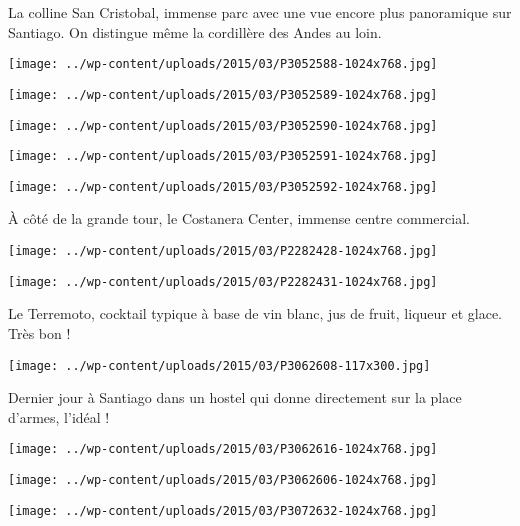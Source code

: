 La colline San Cristobal, immense parc avec une vue encore plus panoramique sur Santiago. On distingue même la cordillère des Andes au loin. 
\begin{center} \texttt{[image: ../wp-content/uploads/2015/03/P3052588-1024x768.jpg]} \end{center}
\begin{center} \texttt{[image: ../wp-content/uploads/2015/03/P3052589-1024x768.jpg]} \end{center}
\begin{center} \texttt{[image: ../wp-content/uploads/2015/03/P3052590-1024x768.jpg]} \end{center}
\begin{center} \texttt{[image: ../wp-content/uploads/2015/03/P3052591-1024x768.jpg]} \end{center}
\vfill
\begin{center} \texttt{[image: ../wp-content/uploads/2015/03/P3052592-1024x768.jpg]} \end{center}
\vspace{-\topsep}
\vspace{-0.75mm}

\pagebreak
\`A côté de la grande tour, le Costanera Center, immense centre commercial. 
\begin{center} \texttt{[image: ../wp-content/uploads/2015/03/P2282428-1024x768.jpg]} \end{center}
\begin{center} \texttt{[image: ../wp-content/uploads/2015/03/P2282431-1024x768.jpg]} \end{center}
\vspace{-\topsep}
\vspace{-3mm}

\pagebreak
 Le Terremoto, cocktail typique à base de vin blanc, jus de fruit, liqueur et glace. Très bon ! 
\begin{center} \texttt{[image: ../wp-content/uploads/2015/03/P3062608-117x300.jpg]} \end{center}

 Dernier jour à Santiago dans un hostel qui donne directement sur la place d'armes, l'idéal ! 
\begin{center} \texttt{[image: ../wp-content/uploads/2015/03/P3062616-1024x768.jpg]} \end{center}
\begin{center} \texttt{[image: ../wp-content/uploads/2015/03/P3062606-1024x768.jpg]} \end{center}
\begin{center} \texttt{[image: ../wp-content/uploads/2015/03/P3072632-1024x768.jpg]} \end{center}

